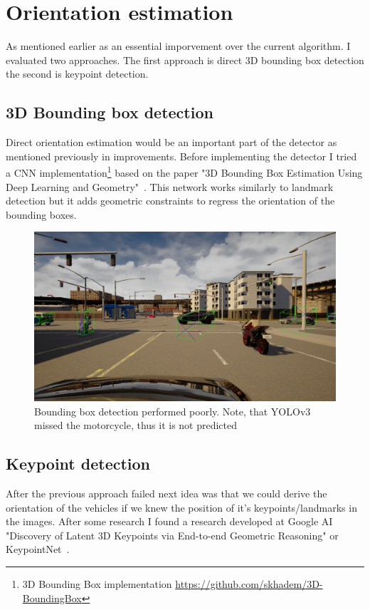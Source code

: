 \section{Orientation estimation}
As mentioned earlier as an essential imporvement over the current algorithm. I
evaluated two approaches. The first approach is direct 3D bounding box detection
the second is keypoint detection.

\subsection{3D Bounding box detection}

Direct orientation estimation would be an important part of the detector as
mentioned previously in improvements. Before implementing the detector I tried a
CNN implementation\footnote{3D Bounding Box implementation
\url{https://github.com/skhadem/3D-BoundingBox}} based on the paper "3D Bounding
Box Estimation Using Deep Learning and
Geometry"~\cite{DBLP:journals/corr/MousavianAFK16}. This network works similarly
to landmark detection but it adds geometric constraints to regress the
orientation of the bounding boxes.

\begin{figure}[!ht]
	\centering
	\includegraphics[width=150mm, keepaspectratio]{figures/boundingbox.png}
	\caption{Bounding box detection performed poorly. Note, that YOLOv3 missed the motorcycle, thus it is not predicted}
	\label{fig:boundingbox}
\end{figure}

\subsection{Keypoint detection}
After the previous approach failed next idea was that we could derive the
orientation of the vehicles if we knew the position of it's keypoints/landmarks
in the images. After some research I found a research developed at Google AI
"Discovery of Latent 3D Keypoints via End-to-end Geometric Reasoning" or
KeypointNet~\cite{suwajanakorn_discovery_2018}. 

